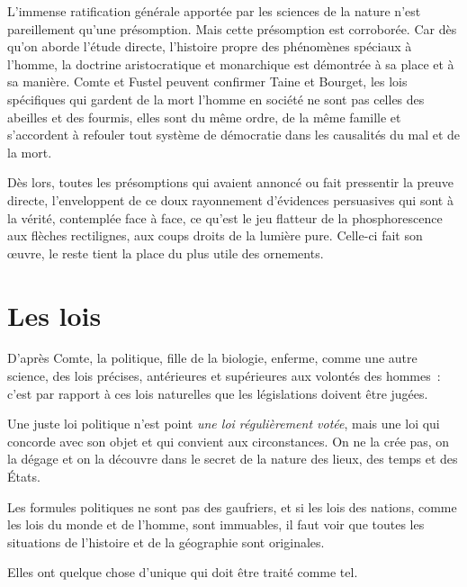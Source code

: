 \documentclass[french,twoside]{book} %
\newcommand{\astermono}{\medskip\centerline{\color{rubric}\large\selectfont{\syms ✻}}\medskip\par}%
\begin{document}
\noindent L’immense ratification générale apportée par les sciences de la nature n’est pareillement qu’une présomption. Mais cette présomption est corroborée. Car dès qu’on aborde l’étude directe, l’histoire propre des phénomènes spéciaux à l’homme, la doctrine aristocratique et monarchique est démontrée à sa place et à sa manière. Comte et Fustel peuvent confirmer Taine et Bourget, les lois spécifiques qui gardent de la mort l’homme en société ne sont pas celles des abeilles et des fourmis, elles sont du même ordre, de la même famille et s’accordent à refouler tout système de démocratie dans les causalités du mal et de la mort.\par
Dès lors, toutes les présomptions qui avaient annoncé ou fait pressentir la preuve directe, l’enveloppent de ce doux rayonnement d’évidences persuasives qui sont à la vérité, contemplée face à face, ce qu’est le jeu flatteur de la phosphorescence aux flèches rectilignes, aux coups droits de la lumière pure. Celle-ci fait son œuvre, le reste tient la place du plus utile des ornements.
\section[Les lois]{Les lois}
\noindent D’après Comte, la politique, fille de la biologie, enferme, comme une autre science, des lois précises, antérieures et supérieures aux volontés des hommes : c’est par rapport à ces lois naturelles que les législations doivent être jugées.\par
Une juste loi politique n’est point \emph{une loi régulièrement votée}, mais une loi qui concorde avec son objet et qui convient aux circonstances. On ne la crée pas, on la dégage et on la découvre dans le secret de la nature des lieux, des temps et des États.\par

\astermono

\noindent Les formules politiques ne sont pas des gaufriers, et si les lois des nations, comme les lois du monde et de l’homme, sont immuables, il faut voir que toutes les situations de l’histoire et de la géographie sont originales.\par
Elles ont quelque chose d’unique qui doit être traité comme tel.\par

\astermono
\end{document}
